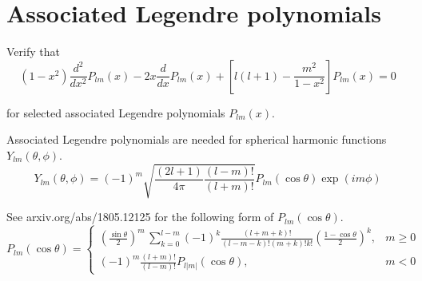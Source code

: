 

\section*{Associated Legendre polynomials}

Verify that
\begin{equation*}
(1-x^2)\frac{d^2}{dx^2}P_{lm}(x)-2x\frac{d}{dx}P_{lm}(x)+\left[l(l+1)-\frac{m^2}{1-x^2}\right]P_{lm}(x)=0
\tag{1}
\end{equation*}

for selected associated Legendre polynomials $P_{lm}(x)$.

\bigskip
Associated Legendre polynomials are needed for spherical harmonic functions $Y_{lm}(\theta,\phi)$.
\begin{equation*}
Y_{lm}(\theta,\phi)=(-1)^m\sqrt{\frac{(2l+1)}{4\pi}\frac{(l-m)!}{(l+m)!}}
P_{lm}(\cos\theta)\exp(im\phi)
\end{equation*}

See arxiv.org/abs/1805.12125 for the following form of $P_{lm}(\cos\theta)$.
\begin{equation*}
P_{lm}(\cos\theta)=\begin{cases}\displaystyle
\left(\frac{\sin\theta}{2}\right)^m\,\sum_{k=0}^{l-m}
(-1)^k\frac{(l+m+k)!}{(l-m-k)!(m+k)!k!}
\left(\frac{1-\cos\theta}{2}\right)^k, & m\ge0
\\[4ex]
\displaystyle(-1)^m\frac{(l+m)!}{(l-m)!}P_{l|m|}(\cos\theta), & m<0
\end{cases}
\end{equation*}



